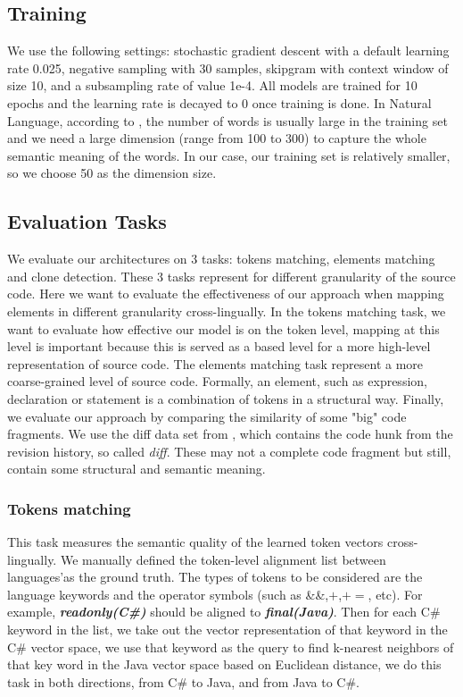 \subsection{Training}
We use the following settings: stochastic gradient descent with a default learning rate 0.025, negative sampling with 30 samples, skipgram with context window of size 10, and a subsampling rate of value 1e-4. All models are trained for 10 epochs and the learning rate is decayed to 0 once training is done. In Natural Language, according to \cite{pennington2014glove}, the number of words is usually large in the training set and we need a large dimension (range from 100 to 300) to capture the whole semantic meaning of the words. In our case, our training set is relatively smaller, so we choose 50 as the dimension size.
\subsection{Evaluation Tasks}
We evaluate our architectures on 3 tasks: tokens matching, elements matching and clone detection. These 3 tasks represent for different granularity of the source code. Here we want to evaluate the effectiveness of our approach when mapping elements in different granularity cross-lingually. In the tokens matching task, we want to evaluate how effective our model is on the token level, mapping at this level is important because this is served as a based level for a more high-level representation of source code. The elements matching task represent a more coarse-grained level of source code. Formally, an element, such as expression, declaration or statement is a combination of tokens in a structural way. Finally, we evaluate our approach by comparing the similarity of some "big" code fragments. We use the diff data set from \cite{cheng2017clcminer}, which contains the code hunk from the revision history, so called \textit{diff}. These may not a complete code fragment but still, contain some structural and semantic meaning.
\subsubsection{Tokens matching}
This task measures the semantic quality of the learned token vectors cross-lingually.  We manually defined the token-level alignment list between languages'as the ground truth. The types of tokens to be considered are the language keywords and the operator symbols (such as \&\&,$+$,$+=$, etc). For example, \textbf{\textit{readonly(C\#)}} should be aligned to \textbf{\textit{final(Java)}}. Then for each C\# keyword in the list, we take out the vector representation of that keyword in the C\# vector space, we use that keyword as the query to find k-nearest neighbors of that key word in the Java vector space based on Euclidean distance, we do this task in both directions, from C\# to Java, and from Java to C\#. 

